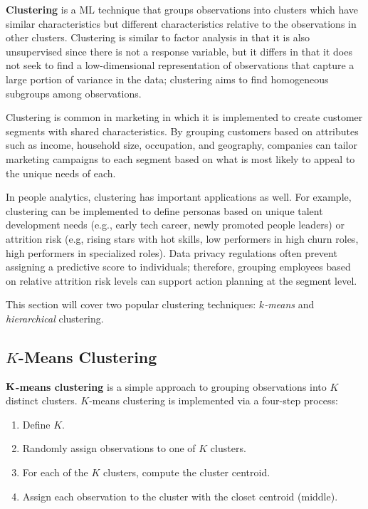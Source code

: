 \documentclass[
]{book}
\providecommand{\tightlist}{%
  \setlength{\itemsep}{0pt}\setlength{\parskip}{0pt}}
\begin{document}
\textbf{Clustering} is a ML technique that groups observations into clusters which have similar characteristics but different characteristics relative to the observations in other clusters. Clustering is similar to factor analysis in that it is also unsupervised since there is not a response variable, but it differs in that it does not seek to find a low-dimensional representation of observations that capture a large portion of variance in the data; clustering aims to find homogeneous subgroups among observations.

Clustering is common in marketing in which it is implemented to create customer segments with shared characteristics. By grouping customers based on attributes such as income, household size, occupation, and geography, companies can tailor marketing campaigns to each segment based on what is most likely to appeal to the unique needs of each.

In people analytics, clustering has important applications as well. For example, clustering can be implemented to define personas based on unique talent development needs (e.g., early tech career, newly promoted people leaders) or attrition risk (e.g, rising stars with hot skills, low performers in high churn roles, high performers in specialized roles). Data privacy regulations often prevent assigning a predictive score to individuals; therefore, grouping employees based on relative attrition risk levels can support action planning at the segment level.

This section will cover two popular clustering techniques: \(k\)\emph{-means} and \emph{hierarchical} clustering.

\hypertarget{k-means-clustering}{%
\subsection{\texorpdfstring{\(K\)-Means Clustering}{K-Means Clustering}}\label{k-means-clustering}}

\(\textbf K\)\textbf{-means clustering} is a simple approach to grouping observations into \(K\) distinct clusters. \(K\)-means clustering is implemented via a four-step process:

\begin{enumerate}
\def\labelenumi{\arabic{enumi}.}
\tightlist
\item
  Define \(K\).
\item
  Randomly assign observations to one of \(K\) clusters.
\item
  For each of the \(K\) clusters, compute the cluster centroid.
\item
  Assign each observation to the cluster with the closet centroid (middle).
\end{enumerate}
\end{document}
